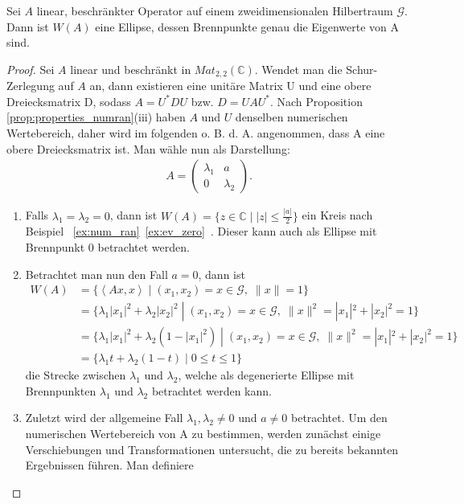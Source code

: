 \begin{lem}[Ellipsenlemma] \label{lem:ell_lem}
	Sei $A$ linear, beschränkter Operator auf einem zweidimensionalen Hilbertraum $\mathcal{G}$. Dann ist $W(A)$ eine Ellipse, dessen Brennpunkte genau die Eigenwerte von A sind.
\end{lem}
\begin{proof}
	Sei $A$ linear und beschränkt in $Mat_{2,2}(\mathbb{C})$. Wendet man die Schur-Zerlegung auf $A$ an, dann existieren eine unitäre Matrix U und eine obere Dreiecksmatrix D, sodass $A=U^*DU$ bzw. $D=UAU^*$. Nach Proposition \ref{prop:properties_numran}(iii) haben $A$ und $U$ denselben numerischen Wertebereich, daher wird im folgenden o. B. d. A. angenommen, dass A eine obere Dreiecksmatrix ist. Man wähle nun als Darstellung:
	\begin{align*}
		A = \begin{pmatrix}
			\lambda_1 & a\\ 
			0 & \lambda_2
		\end{pmatrix} .
	\end{align*} 
	\begin{enumerate}[label=\protect\circled{\arabic*}]
		\item Falls $\lambda_1=\lambda_2 = 0$, dann ist $W(A)= \{ z \in \mathbb{C} \;  | \; |z| \le \frac{|a|}{2} \}$ ein Kreis nach Beispiel \mbox{ \ref{ex:num_ran} \ref{ex:ev_zero} }. Dieser kann auch als Ellipse mit Brennpunkt 0 betrachtet werden.
		\item Betrachtet man nun den Fall $a=0$, dann ist 
		\begin{align}
			W(A) & = \{ \left< Ax,x \right> \; | \; (x_1, x_2)=x \in \mathcal{G},\; \|x\|=1 \} \nonumber \\
			& = \{ \lambda_1 |x_1|^2 + \lambda_2 |x_2|^2 \; | \; (x_1, x_2)=x \in \mathcal{G},\; \|x\|^2=|x_1|^2+|x_2|^2=1 \} \nonumber \\
			& = \{ \lambda_1 |x_1|^2 + \lambda_2 (1-|x_1|^2) \; | \; (x_1, x_2)=x \in \mathcal{G},\; \|x\|^2=|x_1|^2+|x_2|^2=1 \} \nonumber \\
			& = \{ \lambda_1 t + \lambda_2 (1-t)  \; | \; 0 \le t \le 1 \}
		\end{align}
		die Strecke zwischen $\lambda_1$ und $\lambda_2$, welche als degenerierte Ellipse mit Brennpunkten $\lambda_1$ und $\lambda_2$ betrachtet werden kann.
		\item Zuletzt wird der allgemeine Fall $\lambda_1, \lambda_2 \neq 0$ und $a \neq 0$ betrachtet. Um den numerischen Wertebereich von A zu bestimmen, werden zunächst einige Verschiebungen und Transformationen untersucht, die zu bereits bekannten Ergebnissen führen. Man definiere 

\end{enumerate}
\end{proof}
